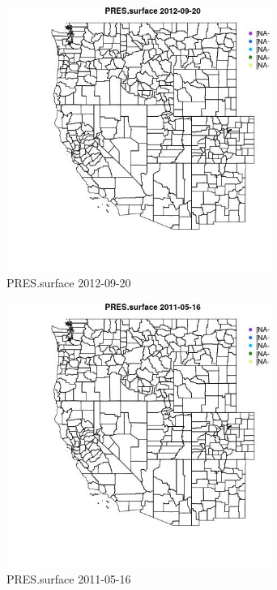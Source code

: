 \begin{figure} 
\centering  
\includegraphics[width=0.77\textwidth]{Code_Outputs/ML_input_report_ML_input_PM25_Step5_part_d_de_duplicated_aves_ML_input_MapObsPRESsurface2012-09-20.jpg} 
\caption{\label{fig:ML_input_report_ML_input_PM25_Step5_part_d_de_duplicated_aves_ML_inputMapObsPRESsurface2012-09-20}PRES.surface 2012-09-20} 
\end{figure} 
 

\begin{figure} 
\centering  
\includegraphics[width=0.77\textwidth]{Code_Outputs/ML_input_report_ML_input_PM25_Step5_part_d_de_duplicated_aves_ML_input_MapObsPRESsurface2011-05-16.jpg} 
\caption{\label{fig:ML_input_report_ML_input_PM25_Step5_part_d_de_duplicated_aves_ML_inputMapObsPRESsurface2011-05-16}PRES.surface 2011-05-16} 
\end{figure} 
 

